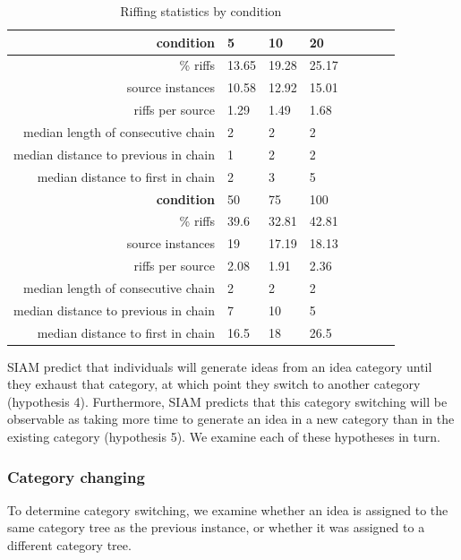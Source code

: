 \begin{table}
\begin{tabular}[h!]{r | l l l l l l l}
    \hline \hline \textbf{condition} & 5 & 10 & 20  \\ \hline \hline
    \% riffs & 13.65 & 19.28 & 25.17  \\
    source instances & 10.58 & 12.92 & 15.01 \\
    riffs per source & 1.29 & 1.49 & 1.68 \\
    median length of consecutive chain & 2 & 2 & 2 \\
    median distance to previous in chain & 1 & 2 & 2 \\
    median distance to first in chain & 2 & 3 & 5 \\ \hline \hline
    \textbf{condition} & 50 & 75 & 100 \\ \hline \hline
    \% riffs & 39.6 & 32.81 & 42.81 \\
    source instances & 19 & 17.19 & 18.13\\
    riffs per source & 2.08 & 1.91 & 2.36\\
    median length of consecutive chain & 2 & 2 & 2\\
    median distance to previous in chain & 7 & 10 & 5\\
    median distance to first in chain & 16.5 & 18 & 26.5 \\
    \end{tabular}
    \caption{Riffing statistics by condition}
    \label{tab:riffing}
\end{table}


SIAM predict that individuals will generate ideas from an idea category until they exhaust that category, at which point they switch to another category (hypothesis 4). Furthermore, SIAM predicts that this category switching will be observable as taking more time to generate an idea in a new category than in the existing category (hypothesis 5). We examine each of these hypotheses in turn.

\subsubsection{Category changing}

To determine category switching, we examine whether an idea is assigned to the same category tree as the previous instance, or whether it was assigned to a different category tree. 


